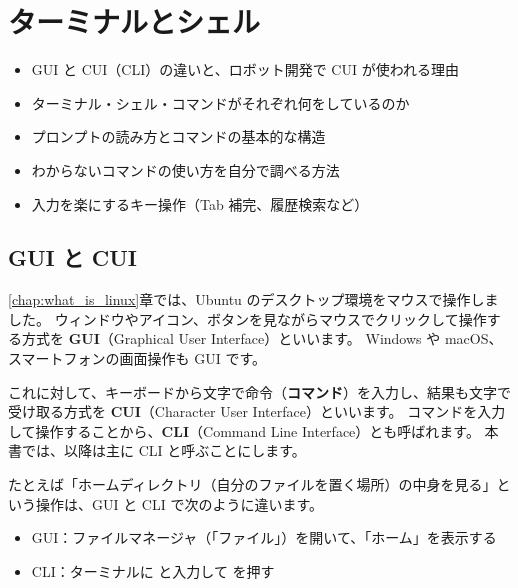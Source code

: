 \chapter{ターミナルとシェル}
\label{chap:terminal_shell}

\begin{goalbox}
  \begin{itemize}
    \item GUI と CUI（CLI）の違いと、ロボット開発で CUI が使われる理由
    \item ターミナル・シェル・コマンドがそれぞれ何をしているのか
    \item プロンプトの読み方とコマンドの基本的な構造
    \item わからないコマンドの使い方を自分で調べる方法
    \item 入力を楽にするキー操作（Tab 補完、履歴検索など）
  \end{itemize}
\end{goalbox}

\section{GUI と CUI}
\label{sec:terminal-gui-cui}

\ref{chap:what_is_linux}章では、Ubuntu のデスクトップ環境をマウスで操作しました。
ウィンドウやアイコン、ボタンを見ながらマウスでクリックして操作する方式を \textbf{GUI}（Graphical User Interface）といいます。
Windows や macOS、スマートフォンの画面操作も GUI です。

これに対して、キーボードから文字で命令（\textbf{コマンド}）を入力し、結果も文字で受け取る方式を \textbf{CUI}（Character User Interface）といいます。
コマンドを入力して操作することから、\textbf{CLI}（Command Line Interface）とも呼ばれます。
本書では、以降は主に CLI と呼ぶことにします。

たとえば「ホームディレクトリ（自分のファイルを置く場所）の中身を見る」という操作は、GUI と CLI で次のように違います。

\begin{itemize}
  \item GUI：ファイルマネージャ（「ファイル」）を開いて、「ホーム」を表示する
  \item CLI：ターミナルに  と入力して  を押す
\end{itemize}


